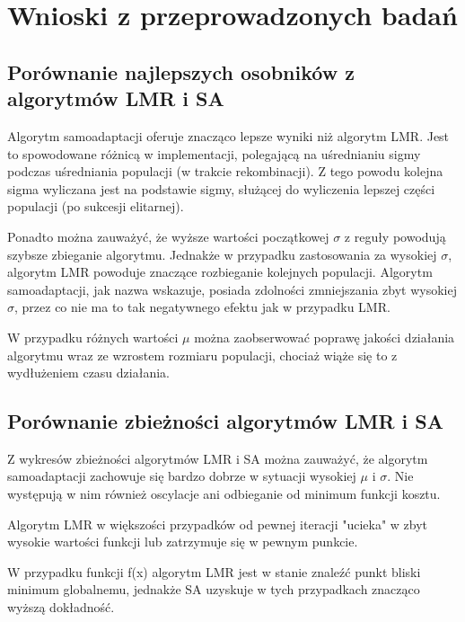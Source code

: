\documentclass{article}
\begin{document}
\section{Wnioski z przeprowadzonych badań}

\subsection{Porównanie najlepszych osobników z algorytmów LMR i SA}

Algorytm samoadaptacji oferuje znacząco lepsze wyniki niż algorytm LMR. Jest to spowodowane różnicą w implementacji, polegającą na uśrednianiu sigmy podczas uśredniania populacji (w trakcie rekombinacji). Z tego powodu kolejna sigma wyliczana jest na podstawie sigmy, służącej do wyliczenia lepszej części populacji (po sukcesji elitarnej).

Ponadto można zauważyć, że wyższe wartości początkowej $\sigma$ z reguły powodują szybsze zbieganie algorytmu. Jednakże w przypadku zastosowania za wysokiej $\sigma$, algorytm LMR powoduje znaczące rozbieganie kolejnych populacji. Algorytm samoadaptacji, jak nazwa wskazuje, posiada zdolności zmniejszania zbyt wysokiej $\sigma$, przez co nie ma to tak negatywnego efektu jak w przypadku LMR.

W przypadku różnych wartości $\mu$ można zaobserwować poprawę jakości działania algorytmu wraz ze wzrostem rozmiaru populacji, chociaż wiąże się to z wydłużeniem czasu działania.

\subsection{Porównanie zbieżności algorytmów LMR i SA}

Z wykresów zbieżności algorytmów LMR i SA można zauważyć, że algorytm samoadaptacji zachowuje się bardzo dobrze w sytuacji wysokiej $\mu$ i $\sigma$. Nie występują w nim również oscylacje ani odbieganie od minimum funkcji kosztu.

Algorytm LMR w większości przypadków od pewnej iteracji "ucieka" w zbyt wysokie wartości funkcji lub zatrzymuje się w pewnym punkcie.

W przypadku funkcji f(x) algorytm LMR jest w stanie znaleźć punkt bliski minimum globalnemu, jednakże SA uzyskuje w tych przypadkach znacząco wyższą dokładność.
\end{document}
